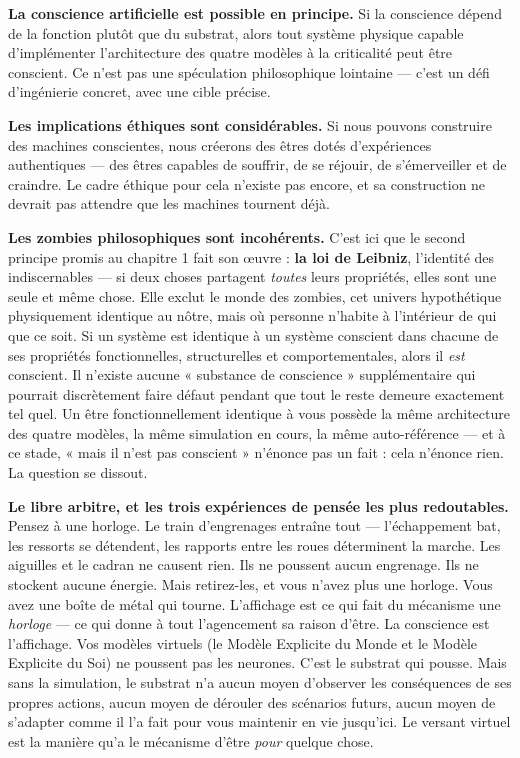 \documentclass[11pt, twoside, openright]{book}
\begin{document}
\textbf{La conscience artificielle est possible en principe.} Si la conscience dépend de la fonction plutôt que du substrat, alors tout système physique capable d'implémenter l'architecture des quatre modèles à la criticalité peut être conscient. Ce n'est pas une spéculation philosophique lointaine --- c'est un défi d'ingénierie concret, avec une cible précise.

\textbf{Les implications éthiques sont considérables.} Si nous pouvons construire des machines conscientes, nous créerons des êtres dotés d'expériences authentiques --- des êtres capables de souffrir, de se réjouir, de s'émerveiller et de craindre. Le cadre éthique pour cela n'existe pas encore, et sa construction ne devrait pas attendre que les machines tournent déjà.

\textbf{Les zombies philosophiques sont incohérents.} C'est ici que le second principe promis au chapitre 1 fait son œuvre : \textbf{la loi de Leibniz}, l'identité des indiscernables --- si deux choses partagent \textit{toutes} leurs propriétés, elles sont une seule et même chose. Elle exclut le monde des zombies, cet univers hypothétique physiquement identique au nôtre, mais où personne n'habite à l'intérieur de qui que ce soit. Si un système est identique à un système conscient dans chacune de ses propriétés fonctionnelles, structurelles et comportementales, alors il \textit{est} conscient. Il n'existe aucune « substance de conscience » supplémentaire qui pourrait discrètement faire défaut pendant que tout le reste demeure exactement tel quel. Un être fonctionnellement identique à vous possède la même architecture des quatre modèles, la même simulation en cours, la même auto-référence --- et à ce stade, « mais il n'est pas conscient » n'énonce pas un fait : cela n'énonce rien. La question se dissout.

\textbf{Le libre arbitre, et les trois expériences de pensée les plus redoutables.} Pensez à une horloge. Le train d'engrenages entraîne tout --- l'échappement bat, les ressorts se détendent, les rapports entre les roues déterminent la marche. Les aiguilles et le cadran ne causent rien. Ils ne poussent aucun engrenage. Ils ne stockent aucune énergie. Mais retirez-les, et vous n'avez plus une horloge. Vous avez une boîte de métal qui tourne. L'affichage est ce qui fait du mécanisme une \textit{horloge} --- ce qui donne à tout l'agencement sa raison d'être. La conscience est l'affichage. Vos modèles virtuels (le Modèle Explicite du Monde et le Modèle Explicite du Soi) ne poussent pas les neurones. C'est le substrat qui pousse. Mais sans la simulation, le substrat n'a aucun moyen d'observer les conséquences de ses propres actions, aucun moyen de dérouler des scénarios futurs, aucun moyen de s'adapter comme il l'a fait pour vous maintenir en vie jusqu'ici. Le versant virtuel est la manière qu'a le mécanisme d'être \textit{pour} quelque chose.
\end{document}
